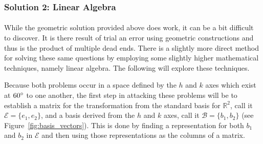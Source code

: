 \documentclass[12pt,letter]{article}
\begin{document}
\subsubsection{Solution 2: Linear Algebra} %
\paragraph{}

While the geometric solution provided above does work, it can be a bit difficult to discover. It is there result of trial an error using geometric constructions and thus is the product of multiple dead ends. There is a slightly more direct method for solving these same questions by employing some slightly higher mathematical techniques, namely linear algebra. The following will explore these techniques.

Because both problems occur in a space defined by the $h$ and $k$ axes which exist at $60\degree$ to one another, the first step in attacking these problems will be to establish a matrix for the transformation from the standard basis for $\mathbb{R}^2$, call it $\mathcal{E} = \{e_1,e_2\}$, and a basis derived from the $h$ and $k$ axes, call it $\mathcal{B} = \{b_1, b_2\}$ (see Figure~\ref{fig:basis_vectors}). This is done by finding a representation for both $b_1$ and $b_2$ in $\mathcal{E}$ and then using those representations as the columns of a matrix. 
\end{document}
